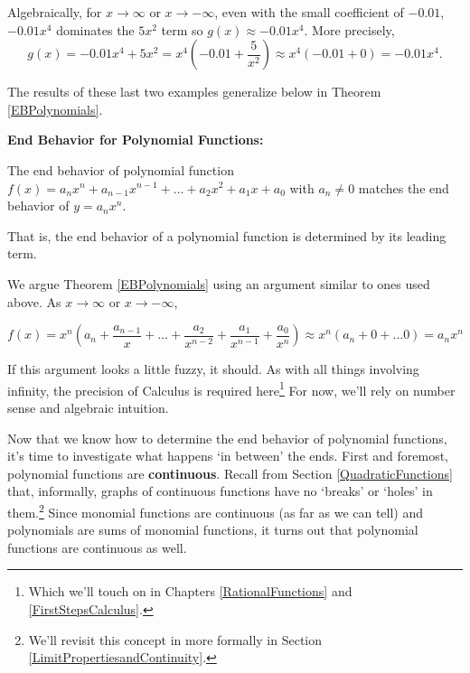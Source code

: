 \documentclass{ximera}
\begin{document}
\begin{center}
\end{center}

Algebraically, for $x \rightarrow  \infty$ or $x \rightarrow -\infty$, even with the small coefficient of $-0.01$, $-0.01x^4$ dominates the $5x^2$ term so $g(x) \approx -0.01 x^4$.  More precisely, \[g(x) = -0.01x^4+5x^2 = x^4 \left(-0.01 + \frac{5}{x^2} \right) \approx x^4(-0.01 + 0)= -0.01x^4. \]

The results of these last two examples generalize below in Theorem \ref{EBPolynomials}.  



\begin{theorem} \label{EBPolynomials}\textbf{End Behavior for Polynomial Functions:} 

The end behavior of  polynomial function $f(x) = a_{n} x^{n} + a_{n-1} x^{n-1} + \ldots + a_2 x^2 + a_1 x + a_0$ with $a_{n} \neq 0$ matches the end behavior of $y = a_{n} x^{n}$.  

That is, the end behavior of a polynomial function is determined by its leading term.
\end{theorem}




We argue Theorem \ref{EBPolynomials} using an argument similar to ones used above.  As $x \rightarrow \infty$ or $x \rightarrow -\infty$, 

\[ f(x) =  x^{n} \left( a_{n} +\dfrac{a_{n-1}}{x}+ \ldots + \dfrac{a_2}{x^{n-2}} + \dfrac{a_1}{x^{n-1}}+\dfrac{a_0}{x^{n}}\right) \approx x^n( a_{n} + 0 +\ldots 0) = a_{n} x^n \]

If this argument looks a little fuzzy, it should.  As with all things involving infinity, the precision of Calculus is required here\footnote{Which we'll touch on in Chapters \ref{RationalFunctions} and \ref{FirstStepsCalculus}.}  For now, we'll rely on number sense and algebraic intuition.


Now that we know how to determine the end behavior of polynomial functions,  it's time to investigate what happens `in between' the ends.  First and foremost, polynomial functions are  \textbf{continuous}.  Recall from Section \ref{QuadraticFunctions} that, informally, graphs of continuous functions have no `breaks' or `holes' in them.\footnote{We'll revisit this concept in more formally in  Section \ref{LimitPropertiesandContinuity}.}   Since monomial functions are continuous (as far as we can tell) and polynomials are sums of monomial functions, it turns out that polynomial functions are continuous as well.  
 
\end{document}
